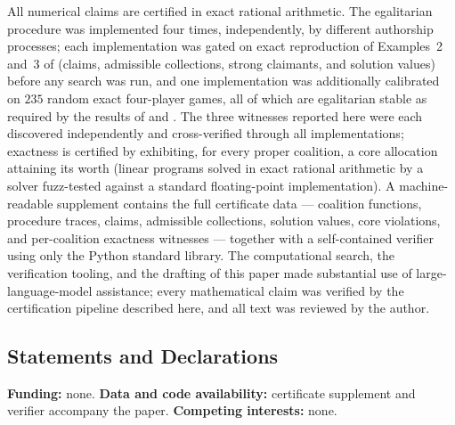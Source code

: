 \documentclass[11pt]{article}
\begin{document}
All numerical claims are certified in exact rational arithmetic. The
egalitarian procedure was implemented four times, independently, by
different authorship processes; each implementation was gated on exact
reproduction of Examples~2 and~3 of \citet{Dietzenbacher2021} (claims,
admissible collections, strong claimants, and solution values) before any
search was run, and one implementation was additionally calibrated on $235$
random exact four-player games, all of which are egalitarian stable as
required by the results of \citet{Biswas1999} and \citet{Dietzenbacher2021}.
The three witnesses reported here were each discovered independently and
cross-verified through all implementations; exactness is certified by
exhibiting, for every proper coalition, a core allocation attaining its
worth (linear programs solved in exact rational arithmetic by a solver
fuzz-tested against a standard floating-point implementation). A
machine-readable supplement contains the full certificate data ---
coalition functions, procedure traces, claims, admissible collections,
solution values, core violations, and per-coalition exactness
witnesses --- together with a self-contained verifier using only the Python
standard library. The computational search, the verification tooling, and
the drafting of this paper made substantial use of large-language-model
assistance; every mathematical claim was verified by the certification
pipeline described here, and all text was reviewed by the author.

\subsection*{Statements and Declarations}
\small
\textbf{Funding:} none.
\textbf{Data and code availability:} certificate supplement and verifier
accompany the paper.
\textbf{Competing interests:} none.
\normalsize
\end{document}
